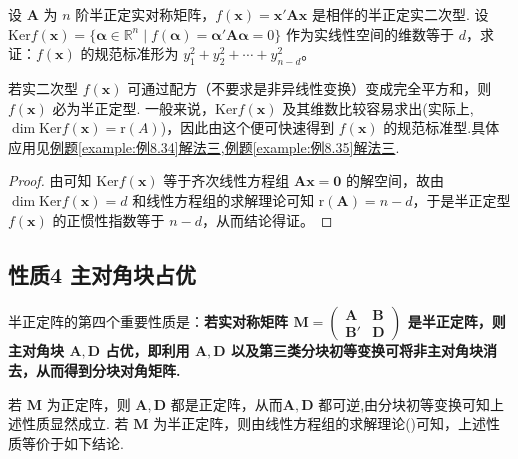 \documentclass[../../main.tex]{subfiles}%
\begin{document}
\begin{proposition}\label{proposition:利用核空间求半正定型的规范标准型}
设 $\boldsymbol{A}$ 为 $n$ 阶半正定实对称矩阵，$f(\boldsymbol{x})=\boldsymbol{x}'\boldsymbol{A}\boldsymbol{x}$ 是相伴的半正定实二次型. 设 $\mathrm{Ker} f(\boldsymbol{x}) =\{\boldsymbol{\alpha}\in\mathbb{R}^n\mid f(\boldsymbol{\alpha})=\boldsymbol{\alpha}'\boldsymbol{A}\boldsymbol{\alpha}=0\}$ 作为实线性空间的维数等于 $d$，求证：$f(\boldsymbol{x})$ 的规范标准形为 $y_1^2 + y_2^2+\cdots + y_{n - d}^2$。
\end{proposition}
\begin{remark}
若实二次型 $f(\boldsymbol{x})$ 可通过配方（不要求是非异线性变换）变成完全平方和，则 $f(\boldsymbol{x})$ 必为半正定型. 一般来说，$\mathrm{Ker} f(\boldsymbol{x})$ 及其维数比较容易求出(实际上,$\dim \mathrm{Ker} f(\boldsymbol{x})=\mathrm{r}(A)$)，因此由这个便可快速得到 $f(\boldsymbol{x})$ 的规范标准型.具体应用见\hyperref[example:例8.34]{例题\ref{example:例8.34}解法三},\hyperref[example:例8.35]{例题\ref{example:例8.35}解法三}.
\end{remark}
\begin{proof}
由可知 $\mathrm{Ker} f(\boldsymbol{x})$ 等于齐次线性方程组 $\boldsymbol{A}\boldsymbol{x}=\boldsymbol{0}$ 的解空间，故由 $\dim\mathrm{Ker} f(\boldsymbol{x}) = d$ 和线性方程组的求解理论可知 $\mathrm{r}(\boldsymbol{A}) = n - d$，于是半正定型 $f(\boldsymbol{x})$ 的正惯性指数等于 $n - d$，从而结论得证。
\end{proof}


\subsection{性质4 主对角块占优}

半正定阵的第四个重要性质是：\textbf{若实对称矩阵 $\boldsymbol{M}=\begin{pmatrix}
\boldsymbol{A} & \boldsymbol{B} \\
\boldsymbol{B}' & \boldsymbol{D}
\end{pmatrix}$ 是半正定阵，则主对角块 $\boldsymbol{A},\boldsymbol{D}$ 占优，即利用 $\boldsymbol{A},\boldsymbol{D}$ 以及第三类分块初等变换可将非主对角块消去，从而得到分块对角矩阵.} 

若 $\boldsymbol{M}$ 为正定阵，则 $\boldsymbol{A},\boldsymbol{D}$ 都是正定阵，从而$\boldsymbol{A},\boldsymbol{D}$ 都可逆,由分块初等变换可知上述性质显然成立. 若 $\boldsymbol{M}$ 为半正定阵，则由线性方程组的求解理论()可知，上述性质等价于如下结论.
\end{document}
